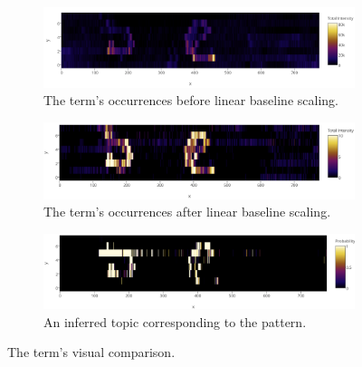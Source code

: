 \documentclass{mpaper}
\begin{document}
\begin{figure}[H]
  \centering

  \begin{subfigure}[b]{0.5\textwidth}
    \caption{The term's occurrences before linear baseline scaling.}
    \includegraphics[width=\linewidth]{pre.png}
  \end{subfigure}%

  \begin{subfigure}[b]{0.5\textwidth}
    \caption{The term's occurrences after linear baseline scaling.}
    \includegraphics[width=\linewidth]{post.png}
  \end{subfigure}%

  \begin{subfigure}[b]{0.5\textwidth}
    \caption{An inferred topic corresponding to the pattern.}
    \includegraphics[width=\linewidth]{topic.png}
  \end{subfigure}%
  \caption{The term's visual comparison.}
  \label{fig:comparison}
\end{figure}
\end{document}
